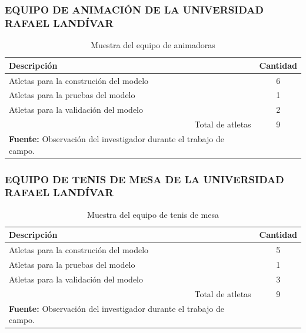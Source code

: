 \subsubsection{EQUIPO DE ANIMACI\'ON DE LA UNIVERSIDAD RAFAEL LAND\'IVAR} \label{sj:1t:ani}
\begin{table}[H]
\begin{center}
\caption{Muestra del equipo de animadoras}
\label{tab:MuestraCheerleaders}
\begin{tabular}{lc}
\hline
\multicolumn{1}{|l|}{\textbf{Descripci\'on}} & \multicolumn{1}{l|}{\textbf{Cantidad}} \\ \hline
\multicolumn{1}{|l|}{Atletas para la construci\'on del modelo} & \multicolumn{1}{c|}{6} \\ \hline
\multicolumn{1}{|l|}{Atletas para la pruebas del modelo} & \multicolumn{1}{c|}{1} \\ \hline
\multicolumn{1}{|l|}{Atletas para la validaci\'on del modelo} & \multicolumn{1}{c|}{2} \\ \hline
\multicolumn{1}{|r|}{Total de atletas} & \multicolumn{1}{c|}{9} \\ \hline
\textbf{Fuente:} Observaci\'on del investigador durante el trabajo de campo.
\end{tabular}
\end{center}
\end{table}
\subsubsection{EQUIPO DE TENIS DE MESA DE LA UNIVERSIDAD RAFAEL LAND\'IVAR}\label{sj:1t:ten}
\begin{table}[H]
\begin{center}
\caption{Muestra del equipo de tenis de mesa}
\label{tab:MuestraTenis}
\begin{tabular}{lc}
\hline
\multicolumn{1}{|l|}{\textbf{Descripci\'on}} & \multicolumn{1}{l|}{\textbf{Cantidad}} \\ \hline
\multicolumn{1}{|l|}{Atletas para la construci\'on del modelo} & \multicolumn{1}{c|}{5} \\ \hline
\multicolumn{1}{|l|}{Atletas para la pruebas del modelo} & \multicolumn{1}{c|}{1} \\ \hline
\multicolumn{1}{|l|}{Atletas para la validaci\'on del modelo} & \multicolumn{1}{c|}{3} \\ \hline
\multicolumn{1}{|r|}{Total de atletas} & \multicolumn{1}{c|}{9} \\ \hline
\textbf{Fuente:} Observaci\'on del investigador durante el trabajo de campo.
\end{tabular}
\end{center}
\end{table}
